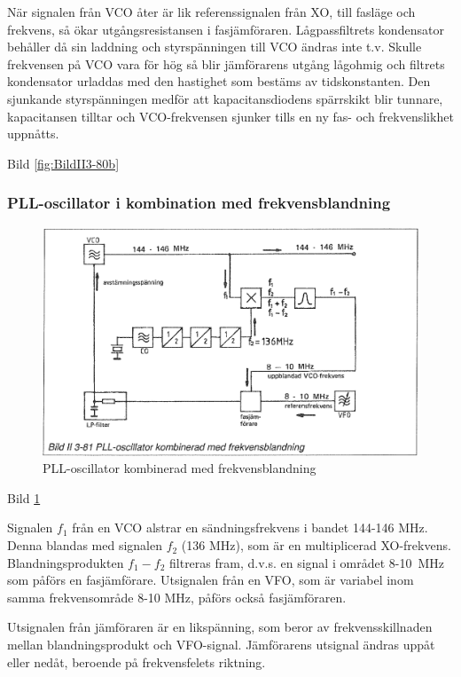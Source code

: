 När signalen från VCO åter är lik referenssignalen från XO, till
fasläge och frekvens, så ökar utgångsresistansen i
fasjämföraren. Lågpassfiltrets kondensator behåller då sin laddning
och styrspänningen till VCO ändras inte t.v. Skulle frekvensen på VCO
vara för hög så blir jämförarens utgång lågohmig och filtrets
kondensator urladdas med den hastighet som bestäms av tidskonstanten.
Den sjunkande styrspänningen medför att kapacitansdiodens
spärrskikt blir tunnare, kapacitansen tilltar och VCO-frekvensen
sjunker tills en ny fas- och frekvenslikhet uppnåtts.

Bild \ref{fig:BildII3-80b}

\subsubsection{PLL-oscillator i kombination med frekvensblandning}

\begin{figure}
\includegraphics[width=\textwidth]{images/bild_2_3-81}
\caption{PLL-oscillator kombinerad med frekvensblandning}
\label{fig:BildII3-81}
\end{figure}

Bild \ref{fig:BildII3-81}

Signalen \(f_1\) från en VCO alstrar en sändningsfrekvens i bandet
144-146 MHz. Denna blandas med signalen \(f_2\) (136 MHz), som är en
multiplicerad XO-frekvens. Blandningsprodukten \(f_1 - f_2\) filtreras
fram, d.v.s. en signal i området 8-10~MHz som påförs en fasjämförare.
Utsignalen från en VFO, som är variabel inom samma frekvensområde 8-10
MHz, påförs också fasjämföraren.

Utsignalen från jämföraren är en likspänning, som beror av
frekvensskillnaden mellan blandningsprodukt och
VFO-signal. Jämförarens utsignal ändras uppåt eller nedåt, beroende på
frekvensfelets riktning.

